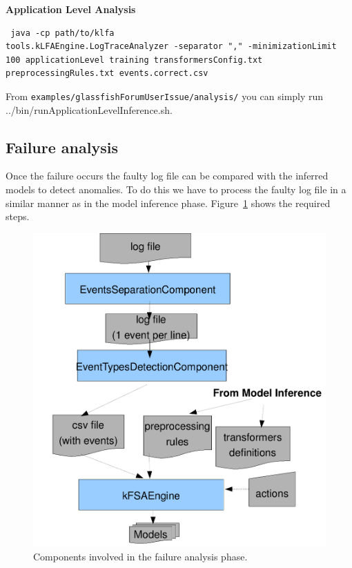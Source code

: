 \textbf{Application Level Analysis}

\begin{verbatim}
 java -cp path/to/klfa
tools.kLFAEngine.LogTraceAnalyzer -separator "," -minimizationLimit
100 applicationLevel training transformersConfig.txt
preprocessingRules.txt events.correct.csv
\end{verbatim}

From \texttt{examples/glassfishForumUserIssue/analysis/} you can simply run
../bin/runApplicationLevelInference.sh.

\subsection{Failure analysis}

Once the failure occurs the faulty log file can be compared with the
inferred models to detect anomalies. To do this we have to process the
faulty log file in a similar manner as in the model inference phase.
Figure~\ref{fig:failureAnalysis} shows the required steps.

\begin{figure}[ht!]
    \begin{center}
        \includegraphics[width=13cm]{images/failureAnalysis}
    \end{center}
    \caption{Components involved in the failure analysis phase.}
\label{fig:failureAnalysis}
\end{figure}

